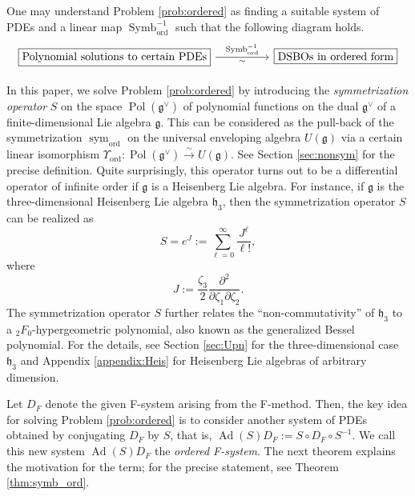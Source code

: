 \documentclass[a4paper,11pt,reqno]{amsart}
\newcommand{\frakg}{\mathfrak{g}}
\newcommand{\frakh}{\mathfrak{h}}
\newcommand{\0}{{\bf 0}}
\newcommand{\1}{{\bf 1}}
\DeclareMathOperator{\Ad}{Ad}
\DeclareMathOperator{\Pol}{Pol}
\newcommand{\ord}{{\mathrm{ord}}}
\DeclareMathOperator{\Symb}{Symb}
\DeclareMathOperator{\sym}{sym}
\theoremstyle{plain}
\theoremstyle{definition}
\numberwithin{equation}{section}
\theoremstyle{definition}
\begin{document}
One may understand Problem \ref{prob:ordered} 
as finding a suitable system of PDEs and a linear map 
$\Symb_{\ord}^{-1}$ such that the following diagram holds.
\begin{equation*}
\begin{tikzcd}
	{\fbox{Polynomial solutions to certain PDEs}} && {\fbox{DSBOs in ordered form}}
	\arrow["{\operatorname{Symb}_{\ord}^{-1}}", "{\sim}"',from=1-1, to=1-3]
\end{tikzcd}
\end{equation*}

In this paper, we solve Problem \ref{prob:ordered} 
by introducing the \emph{symmetrization operator} 
$S$ on the space $\Pol(\frakg^\vee)$
of polynomial functions on the dual $\frakg^\vee$ of a
finite-dimensional Lie algebra $\frakg$.
This can be considered as the pull-back of the symmetrization $\sym_{\ord}$
on the universal enveloping algebra $U(\frakg)$ via a certain linear isomorphism
$\Upsilon_{\ord}\colon \Pol(\frakg^\vee) \stackrel{\sim}{\to} U(\frakg)$. 
See Section \ref{sec:nonsym} for the precise  definition.
Quite surprisingly, this operator turns out to be a differential operator of infinite order 
if $\frakg$ is a Heisenberg Lie algebra.
For instance, if $\frakg$ is the three-dimensional Heisenberg Lie algebra $\frakh_{3}$, then
the symmetrization operator $S$ can be realized as
\begin{equation*}
S=e^J:=\sum_{\ell=0}^\infty \frac{J^\ell}{\ell!},
\end{equation*}
where
\begin{equation*}
J:=\frac{\zeta_3}{2}\frac{\partial^2}{\partial\zeta_1\partial\zeta_2}.
\end{equation*}
The symmetrization operator $S$ further relates the ``non-commutativity'' of $\frakh_3$ to a ${}_2F_0$-hypergeometric polynomial, also known as the 
generalized Bessel polynomial.
For the details,
see Section \ref{sec:Upn} for the three-dimensional case $\frakh_3$ and 
Appendix \ref{appendix:Heis} for 
Heisenberg Lie algebras of arbitrary dimension. 

Let $D_F$ denote the given F-system arising from the F-method. 
Then, the key idea for solving Problem \ref{prob:ordered} 
is to consider another system of PDEs obtained by conjugating $D_F$ by $S$, that is, $\Ad(S)D_F:=S \circ D_F \circ S^{-1}$.
We call this new system $\Ad(S)D_F$ 
the \emph{ordered F-system}.
The next theorem explains the motivation for the term; for the precise statement,
see Theorem \ref{thm:symb_ord}.
\end{document}
